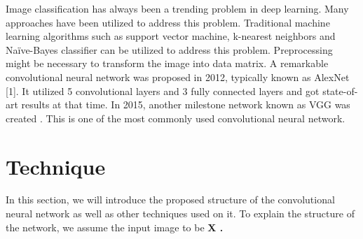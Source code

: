 \documentclass[twoside,twocolumn,10.8pt]{article}
\begin{document}
Image classification has always been a trending problem in deep learning. Many approaches have been utilized to address this problem. Traditional machine learning algorithms such as support vector machine, k-nearest neighbors and Naïve-Bayes classifier can be utilized to address this problem. Preprocessing might be necessary to transform the image into data matrix. A remarkable convolutional neural network was proposed in 2012, typically known as AlexNet [1]. It utilized 5 convolutional layers and 3 fully connected layers and got state-of-art results at that time. In 2015, another milestone network known as VGG was created \cite {R2}. This is one of the most commonly used convolutional neural network.



\section{Technique}

In this section, we will introduce the proposed structure of the convolutional neural network as well as other techniques used on it. To explain the structure of the network, we assume the input image to be \bf X \rm. 
\end{document}

